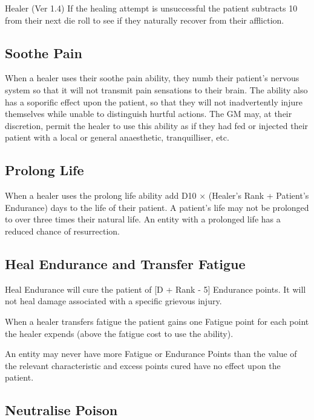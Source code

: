 \begin{Chapter}{Healer (Ver 1.4)}
If the healing attempt is unsuccessful the patient subtracts 10 from
their next die roll to see if they naturally recover from their
affliction.

\subsection{Soothe Pain}

When a healer uses their soothe pain ability, they numb their
patient’s nervous system so that it will not transmit pain sensations
to their brain.  The ability also has a soporific effect upon the
patient, so that they will not inadvertently injure themselves while
unable to distinguish hurtful actions.  The GM may, at their
discretion, permit the healer to use this ability as if they had fed
or injected their patient with a local or general anaesthetic,
tranquilliser, etc.

\subsection{Prolong Life}

When a healer uses the prolong life ability add D10 × (Healer’s Rank +
Patient’s Endurance) days to the life of their patient. A patient’s
life may not be prolonged to over three times their natural life.  An
entity with a prolonged life has a reduced chance of resurrection.

\subsection{Heal Endurance and Transfer Fatigue}

Heal Endurance will cure the patient of [D + Rank - 5] Endurance
points.  It will not heal damage associated with a specific grievous
injury.

When a healer transfers fatigue the patient gains one Fatigue point
for each point the healer expends (above the fatigue cost to use the
ability).

An entity may never have more Fatigue or Endurance Points than the
value of the relevant characteristic and excess points cured have no
effect upon the patient.

\subsection{Neutralise Poison}


\end{Chapter}
